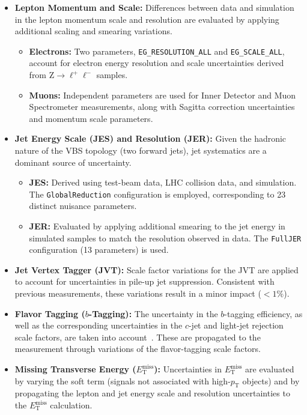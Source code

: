 \begin{itemize}
    \item \textbf{Lepton Momentum and Scale:} 
    Differences between data and simulation in the lepton momentum scale and resolution are evaluated by applying additional scaling and smearing variations.
    \begin{itemize}
        \item \textbf{Electrons:} Two parameters, \texttt{EG\_RESOLUTION\_ALL} and \texttt{EG\_SCALE\_ALL}, account for electron energy resolution and scale uncertainties derived from $\text{Z} \to \ell^+\ell^-$ samples.
        \item \textbf{Muons:} Independent parameters are used for Inner Detector and Muon Spectrometer measurements, along with Sagitta correction uncertainties and momentum scale parameters.
    \end{itemize}

    \item \textbf{Jet Energy Scale (JES) and Resolution (JER):} 
    Given the hadronic nature of the VBS topology (two forward jets), jet systematics are a dominant source of uncertainty.
    \begin{itemize}
        \item \textbf{JES:} Derived using test-beam data, LHC collision data, and simulation. The \texttt{GlobalReduction} configuration is employed, corresponding to 23 distinct nuisance parameters.
        \item \textbf{JER:} Evaluated by applying additional smearing to the jet energy in simulated samples to match the resolution observed in data. The \texttt{FullJER} configuration (13 parameters) is used.
    \end{itemize}
    
    \item \textbf{Jet Vertex Tagger (JVT):} 
    Scale factor variations for the JVT are applied to account for uncertainties in pile-up jet suppression. Consistent with previous measurements, these variations result in a minor impact ($< 1\%$).

    \item \textbf{Flavor Tagging ($b$-Tagging):}
    The uncertainty in the $b$-tagging efficiency, as well as the corresponding uncertainties in the $c$-jet and light-jet rejection scale factors, are taken into account~\cite{FTAG-2018-01}. These are propagated to the measurement through variations of the flavor-tagging scale factors.

    \item \textbf{Missing Transverse Energy ($E_{\text{T}}^{\text{miss}}$):}
    Uncertainties in $E_{\text{T}}^{\text{miss}}$ are evaluated by varying the soft term (signals not associated with high-$p_{\text{T}}$ objects) and by propagating the lepton and jet energy scale and resolution uncertainties to the $E_{\text{T}}^{\text{miss}}$ calculation.
\end{itemize}

